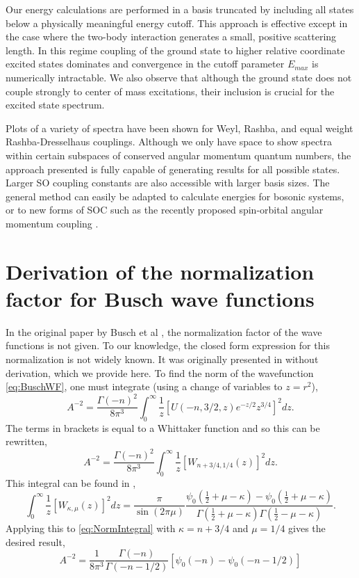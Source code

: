 \documentclass[%
 preprint,
 amsmath,amssymb,
 aps,
]{revtex4-1}
\begin{document}
Our energy calculations are performed in a basis truncated by including all states below a physically meaningful energy cutoff. This approach is effective except in the case where the two-body interaction generates a small, positive scattering length. In this regime coupling of the ground state to higher relative coordinate excited states dominates and convergence in the cutoff parameter $E_{max}$ is numerically intractable. We also observe that although the ground state does not couple strongly to center of mass excitations, their inclusion is crucial for the excited state spectrum. 

Plots of a variety of spectra have been shown for Weyl, Rashba, and equal weight Rashba-Dresselhaus couplings. Although we only have space to show spectra within certain subspaces of conserved angular momentum quantum numbers, the approach presented is fully capable of generating results for all possible states. Larger SO coupling constants are also accessible with larger basis sizes. The general method can easily be adapted to calculate energies for bosonic systems, or to new forms of SOC such as the recently proposed spin-orbital angular momentum coupling \cite{2014arXiv1411.1737S}.



\appendix*
\section{Derivation of the normalization factor for Busch wave functions}
In the original paper by Busch et al \cite{Busch}, the normalization factor of the wave functions is not given. To our knowledge, the closed form expression for this normalization is not widely known. It was originally presented in \cite{PhysRevA.85.053614} without derivation, which we provide here. To find the norm of the wavefunction \eqref{eq:BuschWF}, one must integrate (using a change of variables to $z=r^2$),
\begin{equation}\label{eq:NormIntegral}
A^{-2}=\frac{\Gamma(-n)^2}{8\pi^3}  \int_0^\infty \frac{1}{z}\left[U(-n,3/2,z)e^{-z/2} z^{3/4} \right]^2  dz.
\end{equation}
The terms in brackets is equal to a Whittaker function \cite{DLMF} and so this can be rewritten,
\begin{equation}
A^{-2}=\frac{\Gamma(-n)^2}{8\pi^3}  \int_0^\infty \frac{1}{z}\left[W_{n+3/4,1/4}(z) \right]^2  dz.
\end{equation}
This integral can be found in \cite{GradshteynRyzhik},
\begin{equation}
\int_0^\infty \frac{1}{z}\left[W_{\kappa,\mu}(z) \right]^2  dz=\frac{\pi}{\sin (2\pi \mu)}\frac{\psi_0(\frac{1}{2}+\mu-\kappa)-\psi_0(\frac{1}{2}+\mu-\kappa)}{\Gamma(\frac{1}{2}+\mu-\kappa)\Gamma(\frac{1}{2}-\mu-\kappa)}.
\end{equation}
Applying this to \eqref{eq:NormIntegral} with $\kappa=n+3/4$ and $\mu=1/4$ gives the desired result,
\begin{equation}
A^{-2}=\frac{1}{8\pi^3}  \frac{\Gamma (-n)}{\Gamma(-n-1/2)}\left[\psi_0(-n)-\psi_0(-n-1/2)\right]
\end{equation}
\end{document}
